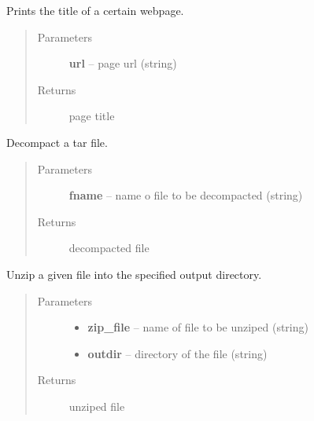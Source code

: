 \documentclass[letterpaper,10pt,english]{sphinxmanual}
\begin{document}

\begin{fulllineitems}
\label{index:BeFaVOr_web.there_is_a_title}
Prints the title of a certain webpage.
\begin{quote}\begin{description}
\item[{Parameters}] \leavevmode
\textbf{url} -- page url (string)

\item[{Returns}] \leavevmode
page title

\end{description}\end{quote}

\end{fulllineitems}


\begin{fulllineitems}
\label{index:BeFaVOr_web.untar}
Decompact a tar file.
\begin{quote}\begin{description}
\item[{Parameters}] \leavevmode
\textbf{fname} -- name o file to be decompacted (string)

\item[{Returns}] \leavevmode
decompacted file

\end{description}\end{quote}

\end{fulllineitems}


\begin{fulllineitems}
\label{index:BeFaVOr_web.unzip}
Unzip a given file into the specified output directory.
\begin{quote}\begin{description}
\item[{Parameters}] \leavevmode\begin{itemize}
\item {} 
\textbf{zip\_file} -- name of file to be unziped (string)

\item {} 
\textbf{outdir} -- directory of the file (string)

\end{itemize}

\item[{Returns}] \leavevmode
unziped file

\end{description}\end{quote}

\end{fulllineitems}
\end{document}

